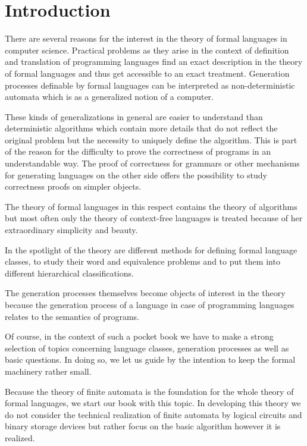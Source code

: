 \chapter*{Introduction}

There are several reasons for the interest in the theory of formal languages in
computer science. Practical problems as they arise in the context of definition
and translation of programming languages find an exact description in the theory
of formal languages and thus get accessible to an exact treatment. Generation
processes definable by formal languages can be interpreted as non-deterministic
automata which is as a generalized notion of a computer.

These kinds of generalizations in general are easier to understand than
deterministic algorithms which contain more details that do not reflect the
original problem but the necessity to uniquely define the algorithm. This is
part of the reason for the difficulty to prove the correctness of programs in an
understandable way. The proof of correctness for grammars or other mechanisms for generating
languages on the other side offers the possibility to study correctness proofs
on simpler objects.

The theory of formal languages in this respect contains the theory of
algorithms but most often only the theory of context-free languages is treated
because of her extraordinary simplicity and beauty.

In the spotlight of the theory are different methods for defining
formal language classes, to study their word and equivalence problems and to
put them into different hierarchical classifications.

The generation processes themselves become objects of interest in the theory
because the generation process of a language in case of programming languages
relates to the semantics of programs.

Of course, in the context of such a pocket book we have to make a strong
selection of topics concerning language classes, generation processes as well as
basic questions. In doing so, we let us guide by the intention to keep the
formal machinery rather small.

Because the theory of finite automata is the foundation for the whole theory of
formal languages, we start our book with this topic. In developing this theory
we do not consider the technical realization of finite automata by logical
circuits and binary storage devices but rather focus on the basic algorithm however it is realized.
 
